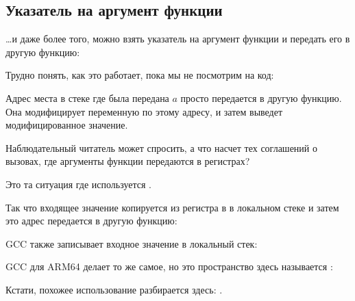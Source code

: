 \subsection{Указатель на аргумент функции}
\label{pointer_to_argument}

\dots и даже более того, можно взять указатель на аргумент функции и передать его в другую функцию:



Трудно понять, как это работает, пока мы не посмотрим на код:



Адрес места в стеке где была передана $a$ просто передается в другую функцию.
Она модифицирует переменную по этому адресу, и затем \printf выведет модифицированное значение.

\par Наблюдательный читатель может спросить, а что насчет тех соглашений о вызовах, где аргументы функции
передаются в регистрах?

Это та ситуация где используется .

Так что входящее значение копируется из регистра в  в локальном стеке и затем это адрес
передается в другую функцию:



GCC также записывает входное значение в локальный стек:



GCC для ARM64 делает то же самое, но это пространство здесь называется :



Кстати, похожее использование  разбирается здесь: .

